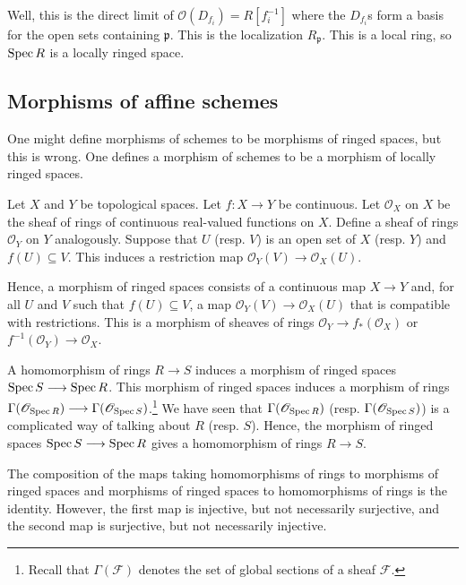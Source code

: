 \documentclass [11 pt, oneside, margin = 1 in] {article}
\begin{document}
Well, this is the direct limit of $\mathscr{O}(D_{f_i})= R[f_i ^{-1}]$ where the $D_{f_i}$s form a basis for the open sets containing $\mathfrak{p}$. This is the localization $R_{\mathfrak{p}}$. This is a local ring, so $\operatorname{Spec} R$ is a locally ringed space.

\subsection{Morphisms of affine schemes}
One might define morphisms of schemes to be morphisms of ringed spaces, but this is wrong. One defines a morphism of schemes to be a morphism of locally ringed spaces. 

Let $X$ and $Y$ be topological spaces. Let $f:X\longrightarrow Y$ be continuous. Let $\mathscr{O}_X$ on $X$ be the sheaf of rings of continuous real-valued functions on $X$. Define a sheaf of rings $\mathscr{O}_Y$ on $Y$ analogously. Suppose that $U$ (resp. $V$) is an open set of $X$ (resp. $Y$) and $f(U)\subseteq V$. This induces a restriction map $\mathscr{O}_Y(V) \longrightarrow \mathscr{O}_X(U)$.

Hence, a morphism of ringed spaces consists of a continuous map $X\longrightarrow Y$ and, for all $U$ and $V$ such that $f(U)\subseteq V$, a map $\mathscr{O}_Y(V) \longrightarrow \mathscr{O}_X(U)$ that is compatible with restrictions. This is a morphism of sheaves of rings $\mathscr{O}_Y\longrightarrow f_*(\mathscr{O}_X)$ or $f^{-1}(\mathscr{O}_Y)\longrightarrow \mathscr{O}_X$.

A homomorphism of rings $R\longrightarrow S$ induces a morphism of ringed spaces $\operatorname{Spec} S \longrightarrow \operatorname{Spec} R$. This morphism of ringed spaces induces a morphism of rings $\Gamma(\mathscr{O}_{\operatorname{Spec} R})\longrightarrow \Gamma(\mathscr{O}_{\operatorname{Spec} S})$.\footnote{Recall that $\Gamma(\mathscr{F})$ denotes the set of global sections of a sheaf $\mathscr{F}$.} We have seen that $\Gamma(\mathscr{O}_{\operatorname{Spec} R})$ (resp. $\Gamma(\mathscr{O}_{\operatorname{Spec} S})$) is a complicated way of talking about $R$ (resp. $S$). Hence, the morphism of ringed spaces $\operatorname{Spec} S \longrightarrow \operatorname{Spec} R$ gives a homomorphism of rings $R\longrightarrow S$.

The composition of the maps taking homomorphisms of rings to morphisms of ringed spaces and morphisms of ringed spaces to homomorphisms of rings is the identity. However, the first map is injective, but not necessarily surjective, and the second map is surjective, but not necessarily injective.
\end{document}
